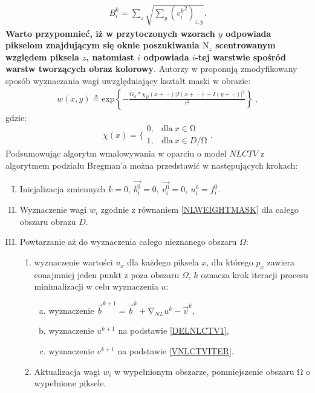 \documentclass[12pt, twoside, openany]{report}
\theoremstyle{definition}
\begin{document}
\begin{align}
B^k_i=\sum_z{\sqrt{\sum_y{\left({v^k_i}^2\right)_{z,y}}}}.
\end{align}
\textbf{Warto przypomnieć, iż w przytoczonych wzorach $y$ odpowiada pikselom znajdującym się oknie poszukiwania ${\mathrm{N}}_z$ scentrowanym względem piksela $z$, natomiast $i$ odpowiada $i$-tej warstwie spośród warstw tworzących obraz kolorowy}. Autorzy w \cite{jung2011nonlocal} proponują zmodyfikowany sposób wyznaczania wagi uwzględniający kształt maski w obrazie:
\begin{align}
w\left(x,y\right)\triangleq {\mathrm{exp} \left\{-\frac{G_{\sigma }*{\chi }_R\left(x+\ \cdot \right){\left|I\left(x+\ \cdot \right)-I\left(y+\ \cdot \right)\right|}^2}{r^2}\right\}\ },
\label{NLWEIGHTMASK}
\end{align}
gdzie:
\begin{equation}
{\chi }\left(x\right)=\Bigg\{ \begin{array}{ll}
0, & \text{dla} \ x \in  \mathrm{\Omega} \\ 
1, & \text{dla} \ x \in  D/\mathrm{\Omega} \end{array}
.
\end{equation}
Podsumowując algorytm wmalowywania w oparciu o model $NLCTV$ z algorytmem podziału Bregman’a można przedstawić w następujących krokach:
\begin{enumerate}[I.]
\item  
Inicjalizacja zmiennych $k=0,\ \overrightarrow{b^0_i}=0,\ \overrightarrow{v^0_i}=0,\ u^0_i=f^0_i$.
\item  
Wyznaczenie wagi $w_i$ zgodnie z równaniem \eqref{NLWEIGHTMASK} dla całego obszaru obrazu $D$.
\item  
Powtarzanie aż do wyznaczenia całego nieznanego obszaru $\Omega$:
\begin{enumerate}[1)]
\item
wyznaczenie wartości $u_x$ dla każdego piksela $x$, dla którego $p_x$ zawiera conajmniej jeden punkt z poza obszaru $\Omega$, $k$ oznacza krok iteracji procesu minimalizacji w celu wyznaczenia $u$:
\begin{enumerate}[a)]
\item
\noindent wyznaczenie ${\overrightarrow{b}}^{k+1}={\overrightarrow{b}}^k+{\mathrm{\nabla }}_{NL}u^k-{\overrightarrow{v}}^k$,
\item
\noindent wyznaczenie $u^{k+1}$ na podstawie \eqref{DELNLCTV1},
\item
\noindent wyznaczenie $v^{k+1}$ na podstawie \eqref{VNLCTVITER}.
\end{enumerate}
\item  
Aktualizacja wagi $w_i$ w wypełnionym obszarze, pomniejszenie obszaru $\mathrm{\Omega }$ o wypełnione piksele.
\end{enumerate}
\end{enumerate}
\end{document}

